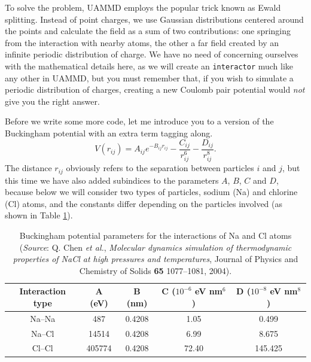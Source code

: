 To solve the problem, UAMMD employs the popular trick known as Ewald splitting. 
Instead of point charges, we use Gaussian distributions centered around the 
points and calculate the field as a sum of two contributions: one springing from 
the interaction with nearby atoms, the other a far field created by an infinite 
periodic distribution of charge. We have no need of concerning ourselves with 
the mathematical details here, as we will create an \texttt{interactor} much 
like any other in UAMMD, but you must remember that, if you wish to simulate a 
periodic distribution of charges, creating a new Coulomb pair potential would 
\textit{not} give you the right answer.

Before we write some more code, let me introduce you to a version of the 
Buckingham potential with an extra term tagging along.
\begin{equation*}
  V(r_{ij}) = A_{ij}e^{-B_{ij}r_{ij}} - \frac{C_{ij}}{r_{ij}^6}
                                      - \frac{D_{ij}}{r_{ij}^8}.
\end{equation*}
The distance $r_{ij}$ obviously refers to the separation between particles $i$ 
and $j$, but this time we have also added subindices to the parameters $A$, $B$, 
$C$ and $D$, because below we will consider two types of particles, sodium (Na) 
and chlorine (Cl) atoms, and the constants differ depending on the particles 
involved (as shown in Table \ref{NaCl_parameters}).

\begin{table}
    \begin{center}
      \begin{tabular}{| c | c | c | c | c |}
			\hline
      Interaction type & A (eV) & B (nm) & C ($10^{-6}$ eV nm$^6$) & D ($10^{-8}$ eV nm$^8$) \\
      \hline
      Na--Na           &    487 & 0.4208 &          1.05           &   0.499 \\
      Na--Cl           &  14514 & 0.4208 &          6.99           &   8.675 \\
      Cl--Cl           & 405774 & 0.4208 &         72.40           & 145.425 \\
      \hline
      \end{tabular}
    \end{center}
    \caption{\label{NaCl_parameters}Buckingham potential parameters for the 
             interactions of Na and Cl atoms (\textit{Source}: Q. Chen 
             \textit{et al.}, \textit{Molecular dynamics simulation of 
             thermodynamic properties of NaCl at high pressures and 
             temperatures}, Journal of Physics and Chemistry of Solids 
             \textbf{65} 1077--1081, 2004).}
\end{table}

